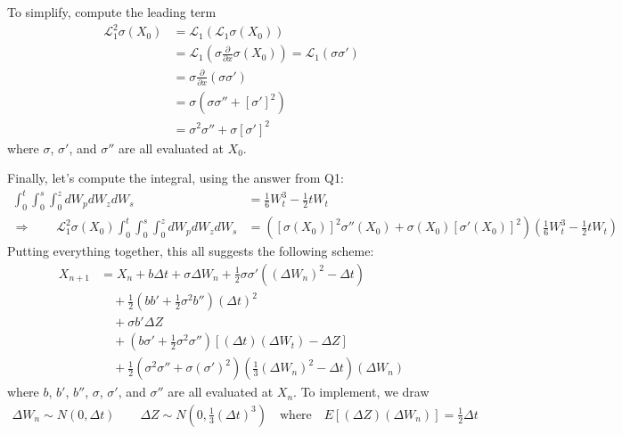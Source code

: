 \documentclass[12pt]{article}
\theoremstyle{plain}
\theoremstyle{definition}
\theoremstyle{remark}
\begin{document}
\begin{enumerate}
    To simplify, compute the leading term
    \begin{align*}
      \mathscr{L}^2_1\sigma(X_0)
      &=
      \mathscr{L}_1\left(\mathscr{L}_1\sigma(X_0)\right) \\
      &=
      \mathscr{L}_1\left(
        \sigma
        \frac{\partial}{\partial x}\sigma(X_0)
      \right)
      = \mathscr{L}_1 \left( \sigma \sigma' \right) \\
      &=
      \sigma
        \frac{\partial}{\partial x}
      \left( \sigma \sigma' \right) \\
      &=
      \sigma
      \left(
        \sigma \sigma''
        + \left[\sigma'\right]^2
      \right) \\
      &=
        \sigma^2 \sigma''
        + \sigma\left[\sigma'\right]^2
    \end{align*}
    where $\sigma$, $\sigma'$, and $\sigma''$ are all evaluated at $X_0$.

    Finally, let's compute the integral, using the answer from Q1:
    \begin{align*}
        \int^t_0\int^s_0 \int^z_0 dW_p dW_z dW_s
        &= \frac{1}{6}W_t^3 - \frac{1}{2} t W_t \\
      \Rightarrow \qquad
        \mathscr{L}^2_1\sigma(X_0)
        \int^t_0\int^s_0 \int^z_0 dW_p dW_z dW_s
        &= \left( [\sigma(X_0)]^2 \sigma''(X_0)
        + \sigma(X_0)\left[\sigma'(X_0)\right]^2\right)
          \left(
          \frac{1}{6}W_t^3 - \frac{1}{2} t W_t\right)
    \end{align*}
    Putting everything together, this all suggests the following scheme:
    \begin{align*}
      X_{n+1}
        &= X_n
        + b\Delta t + \sigma \Delta W_n
        + \frac{1}{2}\sigma\sigma' ( (\Delta W_n)^2 - \Delta t)\\
      &\quad + \frac{1}{2}\left(bb'+\frac{1}{2}\sigma^2 b''\right)
        (\Delta t)^2\\
      &\quad + \sigma b' \Delta Z\\
      &\quad + \left( b\sigma' + \frac{1}{2}\sigma^2\sigma''\right)
      \left[(\Delta t) (\Delta W_t) -\Delta Z\right]\\
      &\quad+ \frac{1}{2}\left(\sigma^2\sigma'' +\sigma(\sigma')^2\right)
        \left(\frac{1}{3}(\Delta W_n)^2 -\Delta t
        \right)(\Delta W_n)
    \end{align*}
    where $b$, $b'$, $b''$, $\sigma$, $\sigma'$, and $\sigma''$ are all
    evaluated at $X_n$. To implement, we draw
    \begin{align*}
      \Delta W_n \sim N(0,\Delta t)
      \qquad
      \Delta Z \sim N\left(0,\frac{1}{3}(\Delta t)^3\right)
      \quad \text{where} \quad
      E[(\Delta Z)(\Delta W_n)] = \frac{1}{2}\Delta t
    \end{align*}



\end{enumerate}
\end{document}
